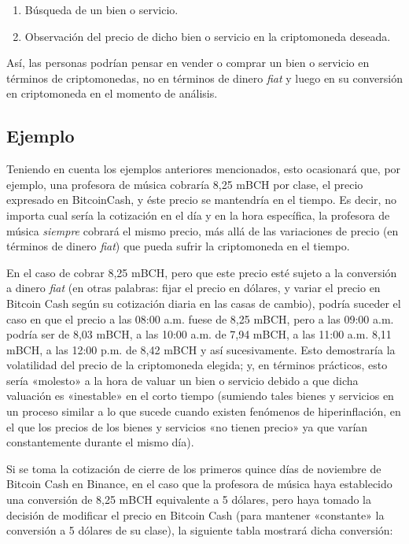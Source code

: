 \documentclass[12pt,a4paper,twoside]{book}
\begin{document}
\begin{enumerate}
\item Búsqueda de un bien o servicio.
\item Observación del precio de dicho bien o servicio en la criptomoneda deseada.
\end{enumerate}

Así, las personas podrían pensar en vender o comprar un bien o servicio en términos de criptomonedas, no en términos de dinero \textit{fiat} y luego en su conversión en criptomoneda en el momento de análisis.

\subsection{Ejemplo}
Teniendo en cuenta los ejemplos anteriores mencionados, esto ocasionará que, por ejemplo, una profesora de música cobraría 8,25 mBCH por clase, el precio expresado en BitcoinCash, y éste precio se mantendría en el tiempo. Es decir, no importa cual sería la cotización en el día y en la hora específica, la profesora de música \textit{siempre} cobrará el mismo precio, más allá de las variaciones de precio (en términos de dinero \textit{fiat}) que pueda sufrir la criptomoneda en el tiempo.

En el caso de cobrar 8,25 mBCH, pero que este precio esté sujeto a la conversión a dinero \textit{fiat} (en otras palabras: fijar el precio en dólares, y variar el precio en Bitcoin Cash según su cotización diaria en las casas de cambio), podría suceder el caso en que el precio a las 08:00 a.m. fuese de 8,25 mBCH, pero a las 09:00 a.m. podría ser de 8,03 mBCH, a las 10:00 a.m. de 7,94 mBCH, a las 11:00 a.m. 8,11 mBCH, a las 12:00 p.m. de 8,42 mBCH y así sucesivamente. Esto demostraría la volatilidad del precio de la criptomoneda elegida; y, en términos prácticos, esto sería «molesto» a la hora de valuar un bien o servicio debido a que dicha valuación es «inestable» en el corto tiempo (sumiendo tales bienes y servicios en un proceso similar a lo que sucede cuando existen fenómenos de hiperinflación, en el que los precios de los bienes y servicios «no tienen precio» ya que varían constantemente durante el mismo día).

Si se toma la cotización de cierre de los primeros quince días de noviembre de Bitcoin Cash en Binance, en el caso que la profesora de música haya establecido una conversión de 8,25 mBCH equivalente a 5 dólares, pero haya tomado la decisión de modificar el precio en Bitcoin Cash (para mantener «constante» la conversión a 5 dólares de su clase), la siguiente tabla mostrará dicha conversión:
\end{document}
